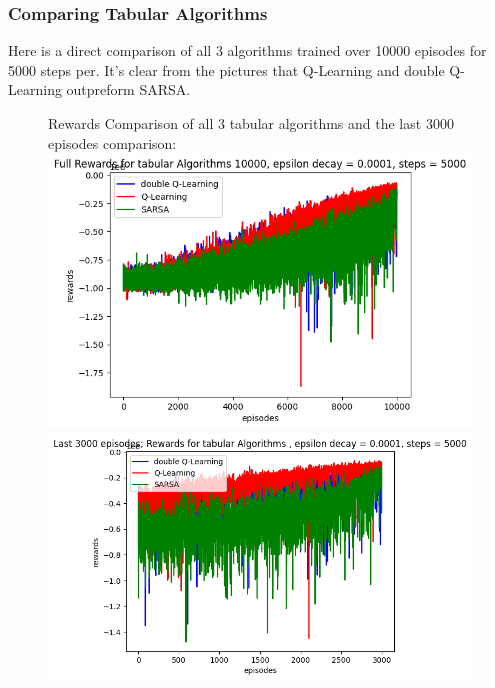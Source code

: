\documentclass[twoside,11pt]{article}
\begin{document}
\subsubsection{Comparing Tabular Algorithms}
{
Here is a direct comparison of all 3 algorithms trained over 10000 episodes for 5000 steps per. It's clear from the pictures that Q-Learning and double Q-Learning outpreform SARSA.
\begin{figure}[H]
Rewards Comparison of all 3 tabular algorithms and the last 3000 episodes comparison:\\
\includegraphics[scale=0.4]{Full_Rewards_Comparison1}
\includegraphics[scale=0.4]{Last_3000_rewards_comparison1}
\centering
\end{figure}
}
\end{document}
